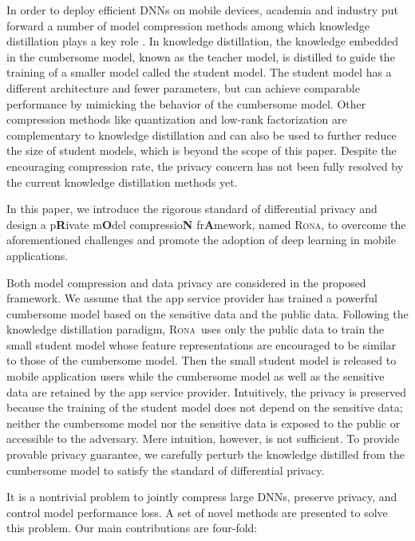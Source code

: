 \documentclass[letterpaper]{article} %
\newcommand*\system{\textsc{Rona}}
\begin{document}
In order to deploy efficient DNNs on mobile devices, academia and industry put forward a number of model compression methods among which knowledge distillation plays a key role \cite{bucila2006model}. In knowledge distillation, the knowledge embedded in the cumbersome model, known as the teacher model, is distilled to guide the training of a smaller model called the student model. The student model has a different architecture and fewer parameters, but can achieve comparable performance by mimicking the behavior of the cumbersome model. Other compression methods like quantization and low-rank factorization \cite{han2015deep,howard2017mobile} are complementary to knowledge distillation and can also be used to further reduce the size of student models, which is beyond the scope of this paper. Despite the encouraging compression rate, the privacy concern has not been fully resolved by the current knowledge distillation methods yet.

In this paper, we introduce the rigorous standard of differential privacy \cite{dwork2011diff} and design a p\textbf{R}ivate m\textbf{O}del compressio\textbf{N} fr\textbf{A}mework, named \system, to overcome the aforementioned challenges and promote the adoption of deep learning in mobile applications.

Both model compression and data privacy are considered in the proposed framework. We assume that the app service provider has trained a powerful cumbersome model based on the sensitive data and the public data. Following the knowledge distillation paradigm, \system\ uses only the public data to train the small student model whose feature representations are encouraged to be similar to those of the cumbersome model. Then the small student model is released to mobile application users while the cumbersome model as well as the sensitive data are retained by the app service provider. Intuitively, the privacy is preserved because the training of the student model does not depend on the sensitive data; neither the cumbersome model nor the sensitive data is exposed to the public or accessible to the adversary. Mere intuition, however, is not sufficient. To provide provable privacy guarantee, we carefully perturb the knowledge distilled from the cumbersome model to satisfy the standard of differential privacy.

It is a nontrivial problem to jointly compress large DNNs, preserve privacy, and control model performance loss. A set of novel methods are presented to solve this problem. Our main contributions are four-fold:
\end{document}
